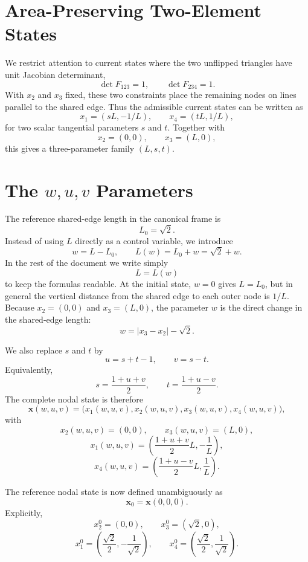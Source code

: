 \documentclass[11pt]{article}
\begin{document}
\section{Area-Preserving Two-Element States}

We restrict attention to current states where the two unflipped triangles have
unit Jacobian determinant,
\[
    \det F_{123}=1,
    \qquad
    \det F_{234}=1.
\]
With \(x_2\) and \(x_3\) fixed, these two constraints place the remaining
nodes on lines parallel to the shared edge. Thus the admissible current states
can be written as
\[
    x_1=(sL,-1/L),
    \qquad
    x_4=(tL,1/L),
\]
for two scalar tangential parameters \(s\) and \(t\). Together with
\[
    x_2=(0,0),
    \qquad
    x_3=(L,0),
\]
this gives a three-parameter family \((L,s,t)\).

\section{The \(w,u,v\) Parameters}

The reference shared-edge length in the canonical frame is
\[
    L_0=\sqrt{2}.
\]
Instead of using \(L\) directly as a control variable, we introduce
\[
    w=L-L_0,
    \qquad
    L(w)=L_0+w=\sqrt{2}+w.
\]
In the rest of the document we write simply
\[
    L = L(w)
\]
to keep the formulas readable. At the initial state, \(w=0\) gives
\(L=L_0\), but in general the vertical distance from the shared edge to each
outer node is \(1/L\). Because \(x_2=(0,0)\) and \(x_3=(L,0)\), the parameter
\(w\) is the direct change in the shared-edge length:
\[
    w = |x_3-x_2|-\sqrt{2}.
\]

We also replace \(s\) and \(t\) by
\[
    u=s+t-1,
    \qquad
    v=s-t.
\]
Equivalently,
\[
    s=\frac{1+u+v}{2},
    \qquad
    t=\frac{1+u-v}{2}.
\]
The complete nodal state is therefore
\[
    \mathbf{x}(w,u,v)
      = \bigl(x_1(w,u,v),x_2(w,u,v),x_3(w,u,v),x_4(w,u,v)\bigr),
\]
with
\[
    x_2(w,u,v)=(0,0),
    \qquad
    x_3(w,u,v)=(L,0),
\]
\[
    x_1(w,u,v)
      =
      \left(
        \frac{1+u+v}{2}L,
        -\frac{1}{L}
      \right),
\]
\[
    x_4(w,u,v)
      =
      \left(
        \frac{1+u-v}{2}L,
        \frac{1}{L}
      \right).
\]

The reference nodal state is now defined unambiguously as
\[
    \mathbf{x}_0 = \mathbf{x}(0,0,0).
\]
Explicitly,
\[
    x_2^0=(0,0),
    \qquad
    x_3^0=(\sqrt{2},0),
\]
\[
    x_1^0=\left(\frac{\sqrt{2}}{2},-\frac{1}{\sqrt{2}}\right),
    \qquad
    x_4^0=\left(\frac{\sqrt{2}}{2},\frac{1}{\sqrt{2}}\right).
\]
\end{document}
